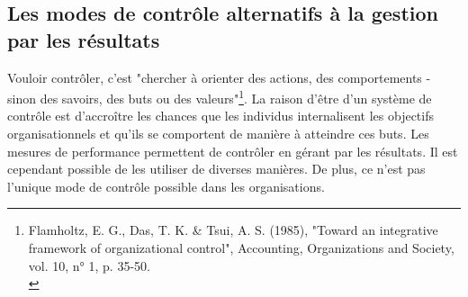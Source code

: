 \documentclass{tufte-handout}
\begin{document}
\subsection{Les modes de contrôle alternatifs à la gestion par les résultats}
\label{sec:org309e26e}
Vouloir contrôler, c'est "chercher à orienter des actions, des comportements - sinon des savoirs, des buts ou des valeurs"\footnote{Flamholtz, E. G., Das, T. K. \& Tsui, A. S. (1985), "Toward an integrative framework of organizational control", Accounting, Organizations and Society, vol. 10, n° 1, p. 35-50.\\}. La raison d'être d'un système de contrôle est d'accroître les chances que les individus internalisent les objectifs organisationnels et qu'ils se comportent de manière à atteindre ces buts. Les mesures de performance permettent de contrôler en gérant par les résultats. Il est cependant possible de les utiliser de diverses manières. De plus, ce n'est pas l'unique mode de contrôle possible dans les organisations.\\
\end{document}
